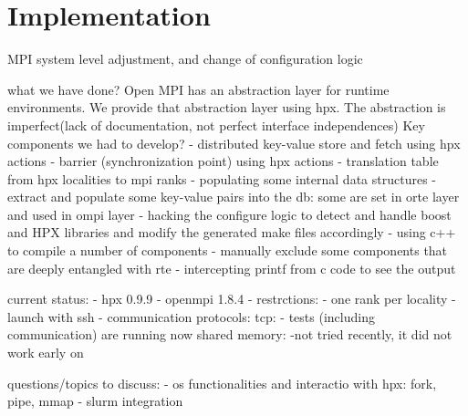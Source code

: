 \section{Implementation}
\label{sec:implementation}
MPI system level adjustment, and change of configuration logic

what we have done?
Open MPI has an abstraction layer for runtime environments.
We provide that abstraction layer using hpx.
The abstraction is imperfect(lack of documentation,
not perfect interface independences)
Key components we had to develop?
- distributed key-value store and fetch using hpx actions
- barrier (synchronization point) using hpx actions
- translation table from hpx localities to mpi ranks
- populating some internal data structures
- extract and populate some key-value pairs into the db:
some are set in orte layer and used in ompi layer
- hacking the configure logic to detect and handle boost and HPX libraries
and modify the generated make files accordingly
- using c++ to compile a number of components
- manually exclude some components that are deeply entangled with rte
- intercepting printf from c code to see the output


current status:
- hpx 0.9.9
- openmpi 1.8.4
- restrctions: - one rank per locality
- launch with ssh
- communication protocols:
tcp: - tests (including communication) are running now
shared memory: -not tried recently, it did not work early on

questions/topics to discuss:
- os functionalities and interactio with hpx: fork, pipe, mmap
- slurm integration

\fi
